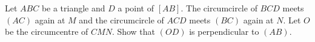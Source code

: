 Let $ABC$ be a triangle and $D$ a point of $[AB]$. The circumcircle of $BCD$ meets $(AC)$ again at $M$ and the circumcircle of $ACD$ meets $(BC)$ again at $N$. Let $O$ be the circumcentre of $CMN$. Show that $(OD)$ is perpendicular to $(AB)$.

